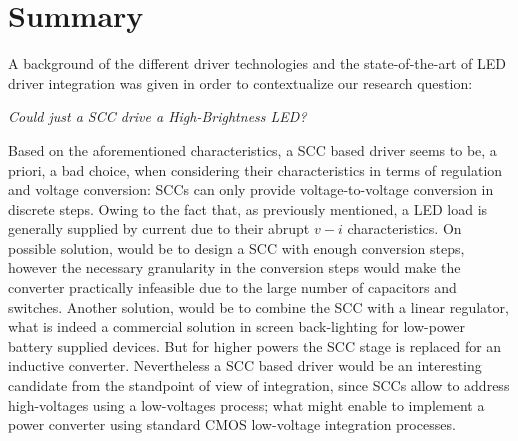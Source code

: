 \section{ Summary}

A background of the different driver technologies and the state-of-the-art of LED driver integration was given in order to contextualize our research question:

\emph{
\centering
 Could just a SCC drive a High-Brightness LED?
 }

Based on the aforementioned characteristics, a SCC based driver seems to be, a priori, a bad choice, when considering their characteristics in terms of regulation and voltage conversion: SCCs can only provide voltage-to-voltage conversion in discrete steps.  Owing to the fact that, as previously mentioned, a LED load is generally supplied by current due to their abrupt $v-i$ characteristics.   On possible solution, would be to design a SCC with enough conversion steps, however the necessary granularity in the conversion steps would make the converter practically infeasible due to the large number of capacitors and switches. Another solution, would be to combine the SCC with a linear regulator, what is indeed a commercial solution in screen back-lighting for low-power battery supplied devices. But for higher powers the SCC stage is replaced for an inductive converter. Nevertheless a SCC based driver would be an interesting candidate from the standpoint of view of integration, since SCCs allow to address high-voltages using a low-voltages process; what might enable to implement a power converter using standard CMOS low-voltage integration processes.

